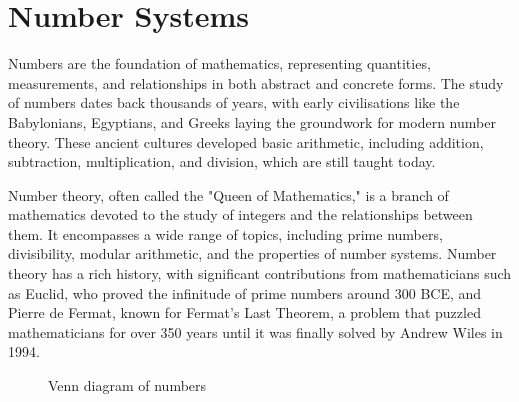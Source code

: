 \chapter{Number Systems}
\label{chap:ch2}
Numbers are the foundation of mathematics, representing quantities, measurements, and relationships in both abstract and concrete forms. The study of numbers dates back thousands of years, with early civilisations like the Babylonians, Egyptians, and Greeks laying the groundwork for modern number theory. These ancient cultures developed basic arithmetic, including addition, subtraction, multiplication, and division, which are still taught today.

Number theory, often called the "Queen of Mathematics," is a branch of mathematics devoted to the study of integers and the relationships between them. It encompasses a wide range of topics, including prime numbers, divisibility, modular arithmetic, and the properties of number systems. Number theory has a rich history, with significant contributions from mathematicians such as Euclid, who proved the infinitude of prime numbers around 300 BCE, and Pierre de Fermat, known for Fermat's Last Theorem, a problem that puzzled mathematicians for over 350 years until it was finally solved by Andrew Wiles in 1994.

\begin{figure}[htbp]
    \centering
{}
    \caption{Venn diagram of numbers}
    \label{fig:venn_num}
\end{figure}

